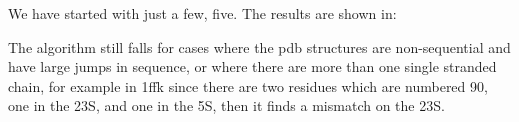 We have started with just a few, five. The results are shown in:

The  algorithm still  falls for  cases  where the  pdb structures  are
non-sequential and  have large jumps  in sequence, or where  there are
more than one  single stranded chain, for example  in 1ffk since there
are two residues which are numbered 90, one in the 23S, and one in the
5S, then it finds a mismatch on the 23S.





